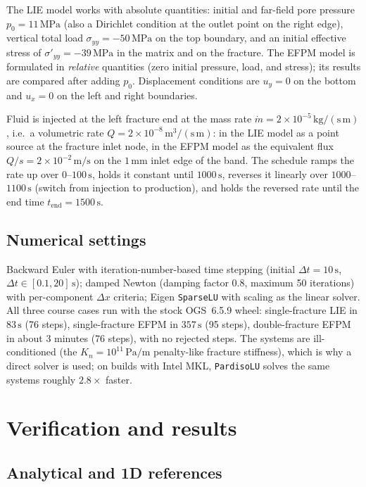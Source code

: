 \documentclass[11pt,a4paper]{tubaf-report}
\newcommand{\MPa}{\,\mathrm{MPa}}
\begin{document}
The LIE model works with absolute quantities: initial and far-field pore
pressure $p_0=11\MPa$ (also a Dirichlet condition at the outlet point on
the right edge), vertical total load $\sigma_{yy}=-50\MPa$ on the top
boundary, and an initial effective stress of
$\sigma'_{yy}=-39\MPa$ in the matrix and on the fracture. The EFPM model is
formulated in \emph{relative} quantities (zero initial pressure, load, and
stress); its results are compared after adding $p_0$. Displacement
conditions are $u_y=0$ on the bottom and $u_x=0$ on the left and right
boundaries.

Fluid is injected at the left fracture end at the mass rate
$\dot m=2\times10^{-5}\,\mathrm{kg/(s\,m)}$, i.e.\ a volumetric rate
$Q=2\times10^{-8}\,\mathrm{m^3/(s\,m)}$: in the LIE model as a point source
at the fracture inlet node, in the EFPM model as the equivalent flux
$Q/s=2\times10^{-2}\,\mathrm{m/s}$ on the $1\,\mathrm{mm}$ inlet edge of the
band. The schedule ramps the rate up over $0$--$100\,\mathrm s$, holds it
constant until $1000\,\mathrm s$, reverses it linearly over
$1000$--$1100\,\mathrm s$ (switch from injection to production), and holds
the reversed rate until the end time $t_{\mathrm{end}}=1500\,\mathrm s$.

\subsection{Numerical settings}

Backward Euler with iteration-number-based time stepping (initial
$\Delta t=10\,\mathrm s$, $\Delta t\in[0.1,20]\,\mathrm s$); damped Newton
(damping factor $0.8$, maximum 50 iterations) with per-component
$\Delta x$ criteria; Eigen \texttt{SparseLU} with scaling as the linear
solver. All three course cases run with the stock OGS~6.5.9 wheel:
single-fracture LIE in $83\,\mathrm s$ (76 steps), single-fracture EFPM in
$357\,\mathrm s$ (95 steps), double-fracture EFPM in about $3$ minutes
(76 steps), with no rejected steps. The systems are ill-conditioned (the
$K_n=10^{11}\,\mathrm{Pa/m}$ penalty-like fracture stiffness), which is why
a direct solver is used; on builds with Intel MKL, \texttt{PardisoLU} solves
the same systems roughly $2.8\times$ faster.

\section{Verification and results}

\subsection{Analytical and 1D references}
\end{document}
